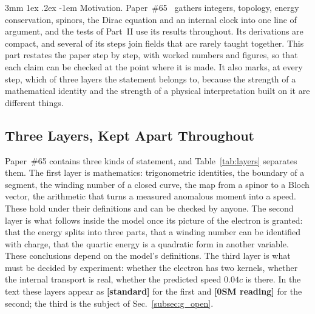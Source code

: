 \documentclass[%
 reprint, amsmath,amssymb, aps, prb, ]{revtex4-2}
\makeatletter
\numberwithin{equation}{section}
\renewcommand\paragraph{%
  \@startsection{paragraph}{4}{\z@}%
    {3mm \@plus 1ex \@minus .2ex}%
    {-1em}%
    {\normalfont\normalsize\itshape}}
\makeatother
\begin{document}
\paragraph{Motivation.} Paper~\#65~\cite{hanamura65} gathers integers, topology, energy conservation, spinors, the Dirac equation and an internal clock into one line of argument, and the tests of Part~II use its results throughout. Its derivations are compact, and several of its steps join fields that are rarely taught together. This part restates the paper step by step, with worked numbers and figures, so that each claim can be checked at the point where it is made. It also marks, at every step, which of three layers the statement belongs to, because the strength of a mathematical identity and the strength of a physical interpretation built on it are different things.

\subsection{Three Layers, Kept Apart Throughout}
\label{subsec:g_layers}

Paper~\#65 contains three kinds of statement, and Table~\ref{tab:layers} separates them. The first layer is mathematics: trigonometric identities, the boundary of a segment, the winding number of a closed curve, the map from a spinor to a Bloch vector, the arithmetic that turns a measured anomalous moment into a speed. These hold under their definitions and can be checked by anyone. The second layer is what follows inside the model once its picture of the electron is granted: that the energy splits into three parts, that a winding number can be identified with charge, that the quartic energy is a quadratic form in another variable. These conclusions depend on the model's definitions. The third layer is what must be decided by experiment: whether the electron has two kernels, whether the internal transport is real, whether the predicted speed $0.04c$ is there. In the text these layers appear as \textbf{[standard]} for the first and \textbf{[0SM reading]} for the second; the third is the subject of Sec.~\ref{subsec:g_open}.
\end{document}
